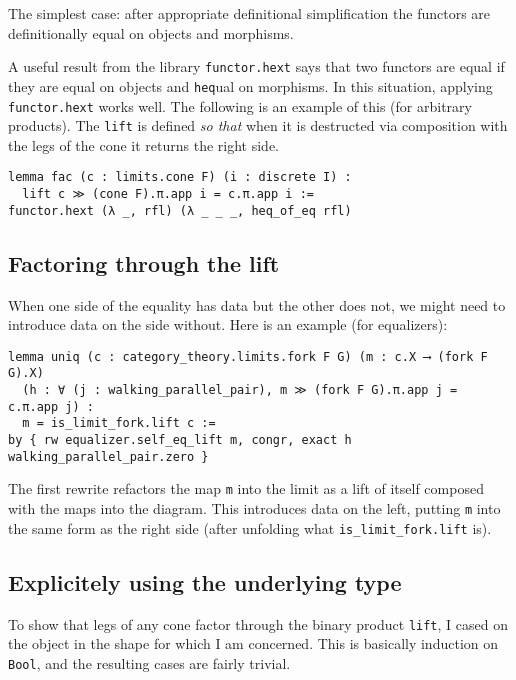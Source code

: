 \documentclass{article}
\newcommand{\<}{\langle}
\renewcommand{\>}{\rangle}
\theoremstyle{definitionstyle}
\theoremstyle{exercisestyle}
\theoremstyle{remarkstyle}
\begin{document}
The simplest case: after appropriate definitional simplification
the functors are definitionally equal on objects and morphisms.

A useful result from the library \texttt{functor.hext}
says that two functors are equal if they are equal on objects and
\texttt{heq}ual on morphisms.
In this situation, applying \texttt{functor.hext} works well.
The following is an example of this (for arbitrary products).
The \texttt{lift} is defined \textit{so that} when it is
destructed via composition with the legs of the cone it returns the right side.

\begin{lstlisting}
lemma fac (c : limits.cone F) (i : discrete I) :
  lift c ≫ (cone F).π.app i = c.π.app i :=
functor.hext (λ _, rfl) (λ _ _ _, heq_of_eq rfl) \end{lstlisting}

\subsection{Factoring through the lift}

When one side of the equality has data but the other does not,
we might need to introduce data on the side without.
Here is an example (for equalizers):

\begin{lstlisting}
lemma uniq (c : category_theory.limits.fork F G) (m : c.X ⟶ (fork F G).X)
  (h : ∀ (j : walking_parallel_pair), m ≫ (fork F G).π.app j = c.π.app j) :
  m = is_limit_fork.lift c :=
by { rw equalizer.self_eq_lift m, congr, exact h walking_parallel_pair.zero } \end{lstlisting}

The first rewrite refactors the map \texttt{m} into the limit as a lift of itself
composed with the maps into the diagram.
This introduces data on the left,
putting \texttt{m} into the same form as the right side
(after unfolding what \texttt{is\_limit\_fork.lift} is).

\subsection{Explicitely using the underlying type}

To show that legs of any cone factor through the binary product \texttt{lift},
I cased on the object in the shape for which I am concerned.
This is basically induction on \texttt{Bool},
and the resulting cases are fairly trivial.
\end{document}
